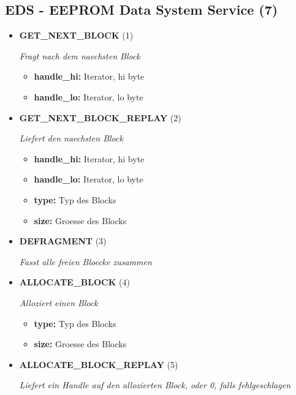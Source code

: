 \subsection{EDS - EEPROM Data System Service (7)}
\begin{itemize}
		
\item \textbf{GET\_NEXT\_BLOCK} (1)

\textit{Fragt nach dem naechsten Block}

\small
\begin{itemize}
		
\item \textbf{handle\_hi:} Iterator, hi byte
\item \textbf{handle\_lo:} Iterator, lo byte
\end{itemize}
\normalsize
	
\item \textbf{GET\_NEXT\_BLOCK\_REPLAY} (2)

\textit{Liefert den naechsten Block}

\small
\begin{itemize}
		
\item \textbf{handle\_hi:} Iterator, hi byte
\item \textbf{handle\_lo:} Iterator, lo byte
\item \textbf{type:} Typ des Blocks
\item \textbf{size:} Groesse des Blocks
\end{itemize}
\normalsize
	
\item \textbf{DEFRAGMENT} (3)

\textit{Fasst alle freien Bloecke zusammen}

\item \textbf{ALLOCATE\_BLOCK} (4)

\textit{Alloziert einen Block}

\small
\begin{itemize}
		
\item \textbf{type:} Typ des Blocks
\item \textbf{size:} Groesse des Blocks
\end{itemize}
\normalsize
	
\item \textbf{ALLOCATE\_BLOCK\_REPLAY} (5)

\textit{Liefert ein Handle auf den allozierten Block, oder 0, falls fehlgeschlagen}


\end{itemize}
